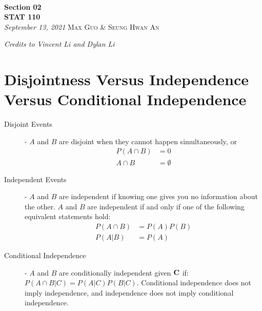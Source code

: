 \documentclass[10pt]{article}
\theoremstyle{definition}
\theoremstyle{remark}
\newcommand{\inserttitle}{Section 02}
\newcommand{\insertauthor}{Max Guo \& Seung Hwan An}
\newcommand{\insertcourse}{STAT 110}
\begin{document}
{\noindent\Huge\bf  \\[0.1\baselineskip] {\inserttitle }}\\[2\baselineskip]
{{\bf \insertcourse}\\ {\textit{September 13, 2021}}} \hfill {\large \textsc{\insertauthor}}
\smallskip

\hfill \noindent \textit{Credits to Vincent Li and Dylan Li}

\section{Disjointness Versus Independence Versus Conditional Independence}

	\begin{description}
		\item[Disjoint Events] - $A$ and $B$ are disjoint when they cannot happen simultaneously, or
		  \begin{align*}
			P(A \cap B) &= 0\\
			A \cap B &= \emptyset
		  \end{align*}
		\item[Independent Events] - $A$ and $B$ are independent if knowing one gives you no information about the other. $A$ and $B$ are independent if and only if one of the following equivalent statements hold: 
		   \begin{align*} 
			P(A\cap B) &= P(A)P(B) \\
			P(A|B) &= P(A)
		   \end{align*}
		\item[Conditional Independence] - $A$ and $B$ are conditionally independent given ${\bf C}$ if: $P(A\cap B|C) = P(A|C)P(B|C)$. Conditional independence does not imply independence, and independence does not imply conditional independence.
	\end{description}
	
\end{document}
